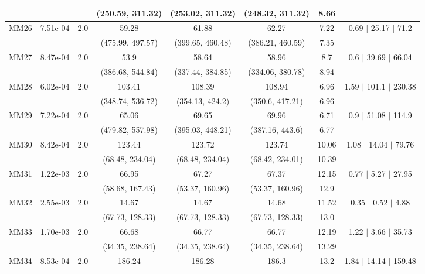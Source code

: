 \begin{longtable}{|c|c|c|c|c|c|c|c|}
	 &  &  & (250.59, 311.32) & (253.02, 311.32) & (248.32, 311.32) & 8.66 & \\
 	\hline
	\multirow{2}{*}{MM26} & \multirow{2}{*}{7.51e-04} & \multirow{2}{*}{2.0} & 59.28 & 61.88 & 62.27 & 7.22 & 0.69 $\mid$ 25.17 $\mid$ 71.2\\
	 &  &  & (475.99, 497.57) & (399.65, 460.48) & (386.21, 460.59) & 7.35 & \\
 	\hline
	\multirow{2}{*}{MM27} & \multirow{2}{*}{8.47e-04} & \multirow{2}{*}{2.0} & 53.9 & 58.64 & 58.96 & 8.7 & 0.6 $\mid$ 39.69 $\mid$ 66.04\\
	 &  &  & (386.68, 544.84) & (337.44, 384.85) & (334.06, 380.78) & 8.94 & \\
 	\hline
	\multirow{2}{*}{MM28} & \multirow{2}{*}{6.02e-04} & \multirow{2}{*}{2.0} & 103.41 & 108.39 & 108.94 & 6.96 & 1.59 $\mid$ 101.1 $\mid$ 230.38\\
	 &  &  & (348.74, 536.72) & (354.13, 424.2) & (350.6, 417.21) & 6.96 & \\
 	\hline
	\multirow{2}{*}{MM29} & \multirow{2}{*}{7.22e-04} & \multirow{2}{*}{2.0} & 65.06 & 69.65 & 69.96 & 6.71 & 0.9 $\mid$ 51.08 $\mid$ 114.9\\
	 &  &  & (479.82, 557.98) & (395.03, 448.21) & (387.16, 443.6) & 6.77 & \\
 	\hline
	\multirow{2}{*}{MM30} & \multirow{2}{*}{8.42e-04} & \multirow{2}{*}{2.0} & 123.44 & 123.72 & 123.74 & 10.06 & 1.08 $\mid$ 14.04 $\mid$ 79.76\\
	 &  &  & (68.48, 234.04) & (68.48, 234.04) & (68.42, 234.01) & 10.39 & \\
 	\hline
	\multirow{2}{*}{MM31} & \multirow{2}{*}{1.22e-03} & \multirow{2}{*}{2.0} & 66.95 & 67.27 & 67.37 & 12.15 & 0.77 $\mid$ 5.27 $\mid$ 27.95\\
	 &  &  & (58.68, 167.43) & (53.37, 160.96) & (53.37, 160.96) & 12.9 & \\
 	\hline
	\multirow{2}{*}{MM32} & \multirow{2}{*}{2.55e-03} & \multirow{2}{*}{2.0} & 14.67 & 14.67 & 14.68 & 11.52 & 0.35 $\mid$ 0.52 $\mid$ 4.88\\
	 &  &  & (67.73, 128.33) & (67.73, 128.33) & (67.73, 128.33) & 13.0 & \\
 	\hline
	\multirow{2}{*}{MM33} & \multirow{2}{*}{1.70e-03} & \multirow{2}{*}{2.0} & 66.68 & 66.77 & 66.77 & 12.19 & 1.22 $\mid$ 3.66 $\mid$ 35.73\\
	 &  &  & (34.35, 238.64) & (34.35, 238.64) & (34.35, 238.64) & 13.29 & \\
 	\hline
	\multirow{2}{*}{MM34} & \multirow{2}{*}{8.53e-04} & \multirow{2}{*}{2.0} & 186.24 & 186.28 & 186.3 & 13.2 & 1.84 $\mid$ 14.14 $\mid$ 159.48\\

\end{longtable}
